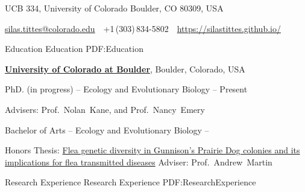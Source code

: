 \documentclass[letterpaper,MMMyyyy,nonstopmode]{simpleresumecv}
\newcommand{\CVAuthor}{Silas Tittes}
\newcommand{\CVWebpage}{https://silastittes.github.io/}
\begin{document}

\Title{\CVAuthor}

\begin{SubTitle}
{UCB 334, University of Colorado Boulder, CO 80309, USA}
\par
\href{mailto:silas.tittes@colorado.edu}
{silas.tittes@colorado.edu}
\,\SubBulletSymbol\,
+1\,(303)\,834-5802
\,\SubBulletSymbol\,
\href{\CVWebpage}
{\url{\CVWebpage}}
\end{SubTitle}

\begin{Body}


\Section
{Education}
{Education}
{PDF:Education}

\Entry
\href{http://www.example.com/my-university}
{\textbf{University of Colorado at Boulder}},
Boulder, Colorado, USA

\Gap
\BulletItem
PhD. (in progress) --
{Ecology and Evolutionary Biology}
\hfill
{} --
Present
\begin{Detail}
\SubBulletItem
Advisers:
Prof.~Nolan~Kane, and
Prof.~Nancy~Emery
\end{Detail}

\Gap
\BulletItem
Bachelor of Arts --
{Ecology and Evolutionary Biology}
\hfill
{} --
\begin{Detail}
\SubBulletItem
Honors Thesis:
\href{https://scholar.colorado.edu/honr_theses/313/}
{Flea genetic diversity in Gunnison's Prairie Dog colonies and its implications for flea transmitted diseases}
\SubBulletItem
Adviser:
Prof.~Andrew~Martin
\end{Detail}


\Section
{Research Experience}
{Research Experience}
{PDF:ResearchExperience}


\end{Body}
\end{document}

